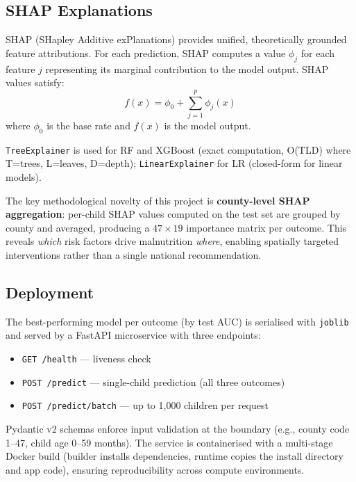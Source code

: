 \documentclass[12pt, a4paper]{article}
\begin{document}
\subsection{SHAP Explanations}
\label{sec:shap}

SHAP (SHapley Additive exPlanations) \citep{Lundberg2017} provides
unified, theoretically grounded feature attributions. For each prediction,
SHAP computes a value $\phi_j$ for each feature $j$ representing its
marginal contribution to the model output. SHAP values satisfy:
\begin{equation}
    f(x) = \phi_0 + \sum_{j=1}^{p} \phi_j(x)
\end{equation}
where $\phi_0$ is the base rate and $f(x)$ is the model output.

\texttt{TreeExplainer} is used for RF and XGBoost (exact computation,
O(TLD) where T=trees, L=leaves, D=depth); \texttt{LinearExplainer} for
LR (closed-form for linear models).

The key methodological novelty of this project is \textbf{county-level
SHAP aggregation}: per-child SHAP values computed on the test set are
grouped by county and averaged, producing a $47 \times 19$ importance
matrix per outcome. This reveals \emph{which} risk factors drive
malnutrition \emph{where}, enabling spatially targeted interventions
rather than a single national recommendation.

\subsection{Deployment}

The best-performing model per outcome (by test AUC) is serialised with
\texttt{joblib} and served by a FastAPI microservice with three endpoints:

\begin{itemize}[noitemsep]
    \item \texttt{GET /health} — liveness check
    \item \texttt{POST /predict} — single-child prediction (all three outcomes)
    \item \texttt{POST /predict/batch} — up to 1,000 children per request
\end{itemize}

Pydantic v2 schemas enforce input validation at the boundary (e.g., county
code 1–47, child age 0–59 months). The service is containerised with a
multi-stage Docker build (builder installs dependencies, runtime copies the
install directory and app code), ensuring reproducibility across compute
environments.
\end{document}
